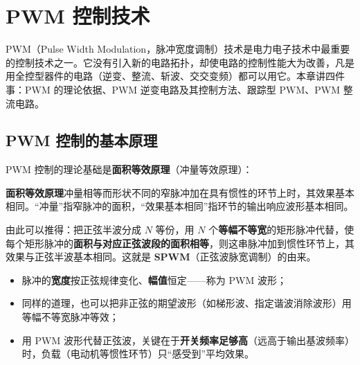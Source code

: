 \chapter{PWM 控制技术}

PWM（Pulse Width Modulation，脉冲宽度调制）技术是电力电子技术中最重要的控制技术之一。它没有引入新的电路拓扑，却使电路的控制性能大为改善，凡是用全控型器件的电路（逆变、整流、斩波、交交变频）都可以用它。本章讲四件事：PWM 的理论依据、PWM 逆变电路及其控制方法、跟踪型 PWM、PWM 整流电路。

\section{PWM 控制的基本原理}

PWM 控制的理论基础是\textbf{面积等效原理}（冲量等效原理）：

\begin{tcolorbox}[enhanced,breakable,colback=highlight,colframe=yhbAccent!30!white,boxrule=0.5pt,arc=2.5pt,left=11pt,right=11pt,top=9pt,bottom=9pt,boxsep=0pt,before skip=11pt,after skip=11pt]
\textbf{面积等效原理}\quad 冲量相等而形状不同的窄脉冲加在具有惯性的环节上时，其效果基本相同。“冲量”指窄脉冲的面积，“效果基本相同”指环节的输出响应波形基本相同。
\end{tcolorbox}

由此可以推得：把正弦半波分成 $N$ 等份，用 $N$ 个\textbf{等幅不等宽}的矩形脉冲代替，使每个矩形脉冲的\textbf{面积与对应正弦波段的面积相等}，则这串脉冲加到惯性环节上，其效果与正弦半波基本相同。这就是 \textbf{SPWM}（正弦波脉宽调制）的由来。

\begin{itemize}
  \item 脉冲的\textbf{宽度}按正弦规律变化、\textbf{幅值}恒定——称为 PWM 波形；
  \item 同样的道理，也可以把非正弦的期望波形（如梯形波、指定谐波消除波形）用等幅不等宽脉冲等效；
  \item 用 PWM 波形代替正弦波，关键在于\textbf{开关频率足够高}（远高于输出基波频率）时，负载（电动机等惯性环节）只“感受到”平均效果。
\end{itemize}


